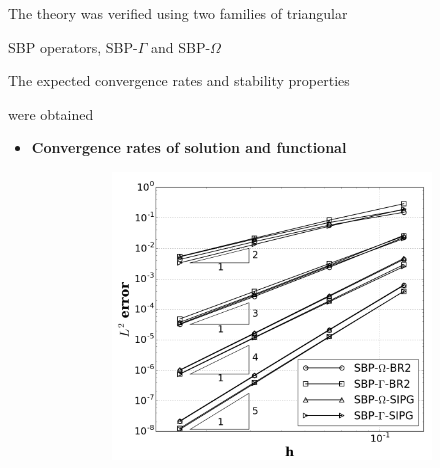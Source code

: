 \documentclass[final]{beamer}
\newlength{\thirdcolwid}
\begin{document}
\begin{frame}[t]
\begin{columns}[t]
\begin{column}{\thirdcolwid}
\begin{alertblock}{The theory was verified using two families of triangular
        
         SBP operators, SBP-$\Gamma$ and SBP-$\Omega$~\cite{multiSBP}}
\end{alertblock}
\vskip-0.6cm
\begin{alertblock}{The expected convergence rates and stability properties 
        
        were obtained}       
\begin{itemize}
    \item \textbf{Convergence rates of solution and functional}
    \begin{figure}  
        \centering
        \begin{subfigure}[b]{0.48\linewidth}
            \centering
            \includegraphics[width=1.\linewidth]{figures/p_accuracy.png}
        \end{subfigure}%
        \begin{subfigure}[b]{0.48\linewidth}
            \centering

\end{subfigure}
\end{figure}
\end{itemize}
\end{alertblock}
\end{column}
\end{columns}
\end{frame}
\end{document}
